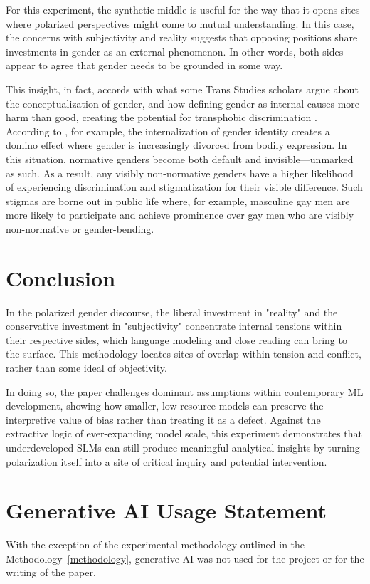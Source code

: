 \documentclass[anonymous,review]{acmart}
\begin{document}
For this experiment, the synthetic middle is useful for the way that it opens sites where polarized perspectives might come to mutual understanding. In this case, the concerns with subjectivity and reality suggests that opposing positions share investments in gender as an external phenomenon. In other words, both sides appear to agree that gender needs to be grounded in some way.

This insight, in fact, accords with what some Trans Studies scholars argue about the conceptualization of gender, and how defining gender as internal causes more harm than good, creating the potential for transphobic discrimination \citep{amin_2022,chu_2024}. According to \citet{amin_2022}, for example, the internalization of gender identity creates a domino effect where gender is increasingly divorced from bodily expression. In this situation, normative genders become both default and invisible---unmarked as such. As a result, any visibly non-normative genders have a higher likelihood of experiencing discrimination and stigmatization for their visible difference. Such stigmas are borne out in public life where, for example, masculine gay men are more likely to participate and achieve prominence over gay men who are visibly non-normative or gender-bending.

\section{Conclusion}

In the polarized gender discourse, the liberal investment in "reality" and the conservative investment in "subjectivity" concentrate internal tensions within their respective sides, which language modeling and close reading can bring to the surface. This methodology locates sites of overlap within tension and conflict, rather than some ideal of objectivity.

In doing so, the paper challenges dominant assumptions within contemporary ML development, showing how smaller, low-resource models can preserve the interpretive value of bias rather than treating it as a defect. Against the extractive logic of ever-expanding model scale, this experiment demonstrates that underdeveloped SLMs can still produce meaningful analytical insights by turning polarization itself into a site of critical inquiry and potential intervention.

\section{Generative AI Usage Statement}
With the exception of the experimental methodology outlined in the  Methodology~\autoref{methodology}, generative AI was not used for the project or for the writing of the paper.
\end{document}
